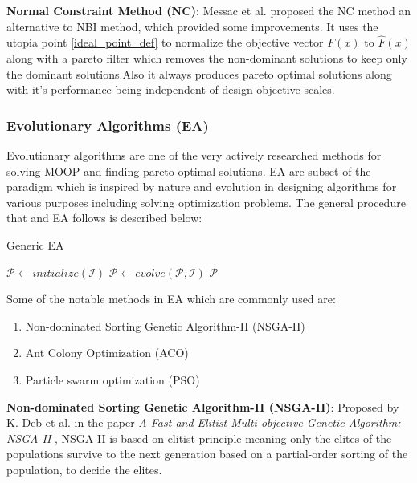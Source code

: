 \newline\newline \textbf{Normal Constraint Method (NC)}: \label{nc_method_def} Messac et al. \cite{messac2003normalized} \cite{messac2004normal} proposed the NC method an alternative to NBI method, which provided some improvements. It uses the utopia point \ref{ideal_point_def} to normalize the objective vector $F(x)$ to $\hat{F}(x)$ along with a pareto filter which removes the non-dominant solutions to keep only the dominant solutions.Also it always produces pareto optimal solutions along with it's performance being independent of design objective scales. 

\subsubsection{Evolutionary Algorithms (EA)}
Evolutionary algorithms are one of the very actively researched methods \cite{vikhar2016evolutionary} for solving MOOP and finding pareto optimal solutions. EA are subset of the paradigm which is inspired by nature and evolution in designing algorithms for various purposes including solving optimization problems. The general procedure that and EA follows is described below:
\begin{algorithm}
\caption{Generic EA}\label{algo_generic_ea}
\begin{algorithmic}
 
    \State $\mathcal{P} \gets initialize(\mathcal{I})$ 
     
        \State $\mathcal{P} \gets evolve(\mathcal{P},\mathcal{I})$ 
    \EndWhile
    \Return $\mathcal{P}$
\EndFunction
\end{algorithmic}
\end{algorithm}\newline Some of the notable methods in EA which are commonly used are:
\begin{enumerate}
    \item Non-dominated Sorting Genetic Algorithm-II (NSGA-II)
    \item Ant Colony Optimization (ACO)
    \item Particle swarm optimization (PSO)
\end{enumerate} 
\textbf{Non-dominated Sorting Genetic Algorithm-II (NSGA-II)}: \label{nsga_2} Proposed by K. Deb et al. in the paper \textit{A Fast and Elitist Multi-objective Genetic Algorithm: NSGA-II} \cite{deb2002fast}, NSGA-II is based on elitist principle meaning only the elites of the populations survive to the next generation based on a partial-order sorting of the population, to decide the elites.

